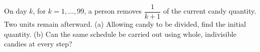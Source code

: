 On day $k$, for $k=1,\ldots,99$, a person removes $\dfrac{1}{k+1}$ of the current candy quantity. Two units remain afterward. (a) Allowing candy to be divided, find the initial quantity. (b) Can the same schedule be carried out using whole, indivisible candies at every step?
